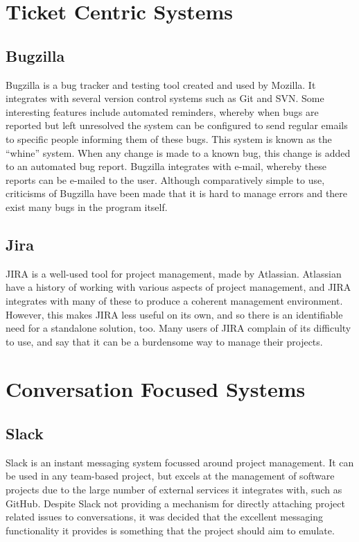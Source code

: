 \documentclass[a4paper]{l3proj}
\begin{document}
\section{Ticket Centric Systems}

\subsection{Bugzilla}
\label{bugzilla}

Bugzilla \cite{site:bugzilla} is a bug tracker and testing tool created and used by Mozilla. It integrates with several version control systems such as Git and SVN.  Some interesting features include automated reminders, whereby when bugs are reported but left unresolved the system can be configured to send regular emails to specific people informing them of these bugs. This system is known as the ``whine'' system.  When any change is made to a known bug, this change is added to an automated bug report.  Bugzilla integrates with e-mail, whereby these reports can be e-mailed to the user. Although comparatively simple to use, criticisms of Bugzilla have been made that it is hard to manage errors and there exist many bugs in the program itself.

\subsection{Jira}
\label{jira}
JIRA \cite{site:jira1} is a well-used tool for project management, made by Atlassian. Atlassian have a history of working with various aspects of project management, and JIRA integrates with many of these to produce a coherent management environment. However, this makes JIRA less useful on its own, and so there is an identifiable need for a standalone solution, too. Many users of JIRA complain of its difficulty to use, and say that it can be a burdensome way to manage their projects.

\section{Conversation Focused Systems}

\subsection{Slack}
\label{slack}
Slack \cite{site:slack} is an instant messaging system focussed around project management. It can be used in any team-based project, but excels at the management of software projects due to the large number of external services it integrates with, such as GitHub. Despite Slack not providing a mechanism for directly attaching project related issues to conversations, it was decided that the excellent messaging functionality it provides is something that the project should aim to emulate.
\end{document}
